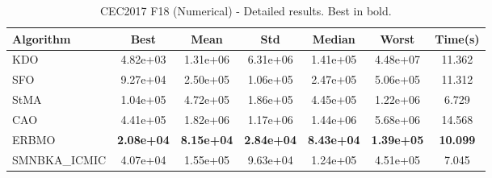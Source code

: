 \begin{table}[H]
\centering\small
\caption{CEC2017 F18 (Numerical) - Detailed results. Best in bold.}
\label{tab:cec2017_F18}
\begin{tabular}{lcccccc}
\toprule
\textbf{Algorithm} & \textbf{Best} & \textbf{Mean} & \textbf{Std} & \textbf{Median} & \textbf{Worst} & \textbf{Time(s)} \\
\midrule
KDO & 4.82e+03 & 1.31e+06 & 6.31e+06 & 1.41e+05 & 4.48e+07 & 11.362 \\
SFO & 9.27e+04 & 2.50e+05 & 1.06e+05 & 2.47e+05 & 5.06e+05 & 11.312 \\
StMA & 1.04e+05 & 4.72e+05 & 1.86e+05 & 4.45e+05 & 1.22e+06 & 6.729 \\
CAO & 4.41e+05 & 1.82e+06 & 1.17e+06 & 1.44e+06 & 5.68e+06 & 14.568 \\
ERBMO & \textbf{2.08e+04} & \textbf{8.15e+04} & \textbf{2.84e+04} & \textbf{8.43e+04} & \textbf{1.39e+05} & \textbf{10.099} \\
SMNBKA_ICMIC & 4.07e+04 & 1.55e+05 & 9.63e+04 & 1.24e+05 & 4.51e+05 & 7.045 \\
\bottomrule
\end{tabular}
\end{table}
